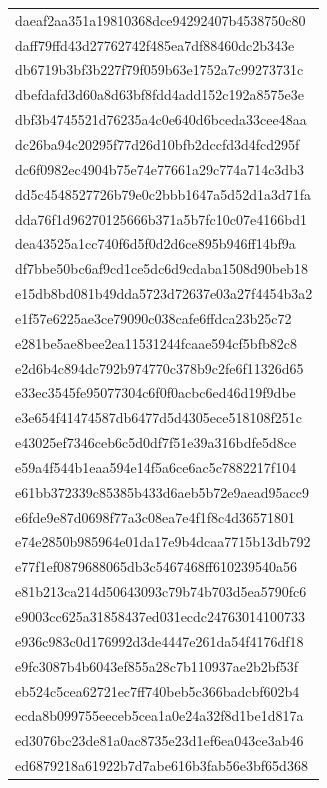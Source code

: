 \begin{tabular}{l}
daeaf2aa351a19810368dce94292407b4538750c80 \\
daff79ffd43d27762742f485ea7df88460dc2b343e \\
db6719b3bf3b227f79f059b63e1752a7c99273731c \\
dbefdafd3d60a8d63bf8fdd4add152c192a8575e3e \\
dbf3b4745521d76235a4c0e640d6bceda33cee48aa \\
dc26ba94c20295f77d26d10bfb2dccfd3d4fcd295f \\
dc6f0982ec4904b75e74e77661a29c774a714c3db3 \\
dd5c4548527726b79e0c2bbb1647a5d52d1a3d71fa \\
dda76f1d96270125666b371a5b7fc10c07e4166bd1 \\
dea43525a1cc740f6d5f0d2d6ce895b946ff14bf9a \\
df7bbe50bc6af9cd1ce5dc6d9cdaba1508d90beb18 \\
e15db8bd081b49dda5723d72637e03a27f4454b3a2 \\
e1f57e6225ae3ce79090c038cafe6ffdca23b25c72 \\
e281be5ae8bee2ea11531244fcaae594cf5bfb82c8 \\
e2d6b4c894dc792b974770c378b9c2fe6f11326d65 \\
e33ec3545fe95077304c6f0f0acbc6ed46d19f9dbe \\
e3e654f41474587db6477d5d4305ece518108f251c \\
e43025ef7346ceb6c5d0df7f51e39a316bdfe5d8ce \\
e59a4f544b1eaa594e14f5a6ce6ac5c7882217f104 \\
e61bb372339c85385b433d6aeb5b72e9aead95acc9 \\
e6fde9e87d0698f77a3c08ea7e4f1f8c4d36571801 \\
e74e2850b985964e01da17e9b4dcaa7715b13db792 \\
e77f1ef0879688065db3c5467468ff610239540a56 \\
e81b213ca214d50643093c79b74b703d5ea5790fc6 \\
e9003cc625a31858437ed031ecdc24763014100733 \\
e936c983c0d176992d3de4447e261da54f4176df18 \\
e9fc3087b4b6043ef855a28c7b110937ae2b2bf53f \\
eb524c5cea62721ec7ff740beb5c366badcbf602b4 \\
ecda8b099755eeceb5cea1a0e24a32f8d1be1d817a \\
ed3076bc23de81a0ac8735e23d1ef6ea043ce3ab46 \\
ed6879218a61922b7d7abe616b3fab56e3bf65d368 \\

\end{tabular}
